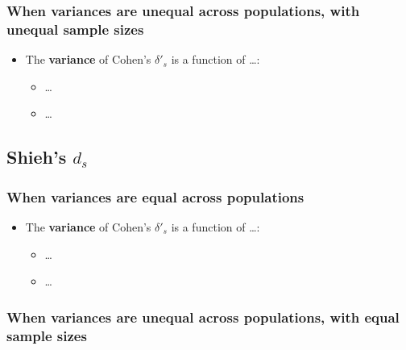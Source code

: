 \documentclass[
  man]{apa6}
\providecommand{\tightlist}{%
  \setlength{\itemsep}{0pt}\setlength{\parskip}{0pt}}
\begin{document}
\hypertarget{when-variances-are-unequal-across-populations-with-unequal-sample-sizes-3}{%
\subsubsection{When variances are unequal across populations, with unequal sample sizes}\label{when-variances-are-unequal-across-populations-with-unequal-sample-sizes-3}}

\begin{itemize}
\tightlist
\item
  The \textbf{variance} of Cohen's \(\delta'_s\) is a function of \ldots:

  \begin{itemize}
  \tightlist
  \item
    \ldots{}
  \item
    \ldots{}
  \end{itemize}
\end{itemize}

\hypertarget{shiehs-d_s-1}{%
\subsection{\texorpdfstring{Shieh's \(d_s\)}{Shieh's d\_s}}\label{shiehs-d_s-1}}

\hypertarget{when-variances-are-equal-across-populations-6}{%
\subsubsection{When variances are equal across populations}\label{when-variances-are-equal-across-populations-6}}

\begin{itemize}
\tightlist
\item
  The \textbf{variance} of Cohen's \(\delta'_s\) is a function of \ldots:

  \begin{itemize}
  \tightlist
  \item
    \ldots{}
  \item
    \ldots{}
  \end{itemize}
\end{itemize}

\hypertarget{when-variances-are-unequal-across-populations-with-equal-sample-sizes-4}{%
\subsubsection{When variances are unequal across populations, with equal sample sizes}\label{when-variances-are-unequal-across-populations-with-equal-sample-sizes-4}}
\end{document}

